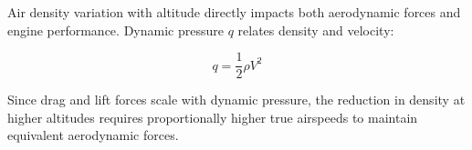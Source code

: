 Air density variation with altitude directly impacts both aerodynamic forces and engine performance. Dynamic pressure $q$ relates density and velocity:

\begin{equation}
q = \frac{1}{2}\rho V^2
\end{equation}

Since drag and lift forces scale with dynamic pressure, the reduction in density at higher altitudes requires proportionally higher true airspeeds to maintain equivalent aerodynamic forces.  
